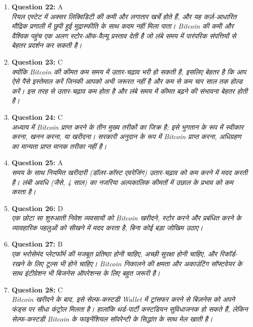 \documentclass[12pt,a4paper]{article}
\begin{document}
\begin{enumerate}
\item \textbf{Question 22:} A
\\ \textit{रियल एस्टेट में अक्सर लिक्विडिटी की कमी और लगातार खर्चे होते हैं, और यह कर्ज़-आधारित मौद्रिक प्रणाली में छुपी हुई मुद्रास्फीति के साथ कदम नहीं मिला पाता। Bitcoin की कमी और वैश्विक पहुंच एक अलग स्टोर-ऑफ-वैल्यू प्रस्ताव देती है जो लंबे समय में पारंपरिक संपत्तियों से बेहतर प्रदर्शन कर सकती है।}

\item \textbf{Question 23:} C
\\ \textit{क्योंकि Bitcoin की कीमत कम समय में उतार-चढ़ाव भरी हो सकती है, इसलिए बेहतर है कि आप ऐसे पैसे इस्तेमाल करें जिनकी आपको अभी जरूरत नहीं है और कम से कम चार साल तक होल्ड करें। इस तरह से उतार-चढ़ाव कम होता है और लंबे समय में कीमत बढ़ने की संभावना बेहतर होती है।}

\item \textbf{Question 24:} C
\\ \textit{अध्याय में Bitcoin प्राप्त करने के तीन मुख्य तरीकों का जिक्र है; इसे भुगतान के रूप में स्वीकार करना, खनन करना, या खरीदना। सरकारी अनुदान के रूप में Bitcoin प्राप्त करना, अधिग्रहण का मान्यता प्राप्त मानक तरीका नहीं है।}

\item \textbf{Question 25:} A
\\ \textit{समय के साथ नियमित खरीदारी (डॉलर-कॉस्ट एवरेजिंग) उतार-चढ़ाव को कम करने में मदद करती है। लंबी अवधि (जैसे, 4 साल) का नजरिया अल्पकालिक कीमतों में उछाल के प्रभाव को कम करता है।}

\item \textbf{Question 26:} D
\\ \textit{एक छोटा सा शुरुआती निवेश व्यवसायों को Bitcoin खरीदने, स्टोर करने और प्रबंधित करने के व्यावहारिक पहलुओं को सीखने में मदद करता है, बिना कोई बड़ा जोखिम उठाए।}

\item \textbf{Question 27:} B
\\ \textit{एक भरोसेमंद प्लेटफॉर्म की मजबूत प्रतिष्ठा होनी चाहिए, अच्छी सुरक्षा होनी चाहिए, और रिकॉर्ड-रखने के लिए टूल्स भी होने चाहिए। Bitcoin निकालने की क्षमता और अकाउंटिंग सॉफ्टवेयर के साथ इंटीग्रेशन भी बिजनेस ऑपरेशन्स के लिए बहुत जरूरी है।}

\item \textbf{Question 28:} C
\\ \textit{Bitcoin खरीदने के बाद, इसे सेल्फ-कस्टडी Wallet में ट्रांसफर करने से बिज़नेस को अपने फंड्स पर सीधा कंट्रोल मिलता है। हालांकि थर्ड-पार्टी कस्टडियन सुविधाजनक हो सकते हैं, लेकिन सेल्फ-कस्टडी Bitcoin के फाइनेंशियल सॉवरेन्टी के सिद्धांत के साथ मेल खाती है।}


\end{enumerate}
\end{document}
